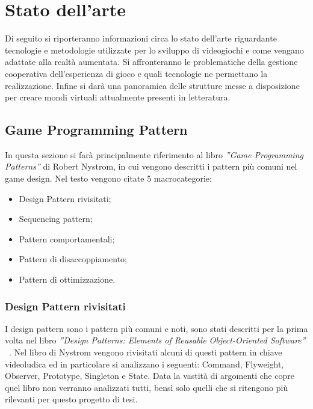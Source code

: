 \chapter{Stato dell'arte}\label{chap:Letteratura}
Di seguito si riporteranno informazioni circa lo stato dell'arte riguardante
tecnologie e metodologie utilizzate per lo sviluppo di videogiochi e come 
vengano adattate alla realtà aumentata. Si affronteranno le problematiche della 
gestione cooperativa dell'esperienza di gioco e quali tecnologie ne permettano 
la realizzazione. Infine si darà una panoramica delle strutture messe a 
disposizione per creare mondi virtuali attualmente presenti in letteratura.

\section{Game Programming Pattern}\label{sec:GameProgrammingPattern}
In questa sezione si farà principalmente riferimento al libro \textit{''Game Programming Patterns''}
di Robert Nystrom\cite{Nystrom2014}, in cui vengono descritti i pattern più comuni nel
game design. Nel testo vengono citate 5 macrocategorie:
\begin{itemize}
    \item Design Pattern rivisitati;
    \item Sequencing pattern;
    \item Pattern comportamentali;
    \item Pattern di disaccoppiamento;
    \item Pattern di ottimizzazione.
\end{itemize}

\subsection{Design Pattern rivisitati}\label{ssec:DesignPattern}
I design pattern sono i pattern più comuni e noti, sono stati descritti per la prima
volta nel libro \textit{''Design Patterns: Elements of Reusable Object-Oriented Software''}
~\cite{gangof4}. Nel libro di Nystrom vengono rivisitati alcuni di questi pattern
in chiave videoludica ed in particolare si analizzano i seguenti: Command, Flyweight,
Observer, Prototype, Singleton e State. Data la vastità di argomenti che copre quel libro
non verranno analizzati tutti, bensì solo quelli che si ritengono più rilevanti per
questo progetto di tesi.

